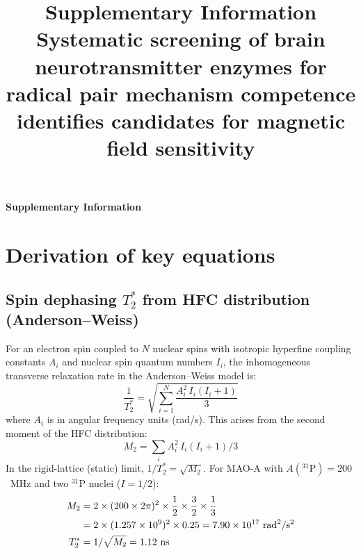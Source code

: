 \documentclass[11pt]{article}
\title{\textbf{Supplementary Information}\\[0.5em]
Systematic screening of brain neurotransmitter enzymes for radical pair mechanism competence identifies candidates for magnetic field sensitivity}
\date{}
\begin{document}
\maketitle
\clearpage
\setcounter{equation}{0}
\setcounter{figure}{0}
\setcounter{table}{0}
\renewcommand{\theequation}{S\arabic{equation}}
\renewcommand{\thefigure}{S\arabic{figure}}
\renewcommand{\thetable}{S\arabic{table}}

\begin{center}
{\LARGE\bfseries Supplementary Information}
\end{center}
\vspace{1em}



\newpage

\section{Derivation of key equations}

\subsection{Spin dephasing $T_2^*$ from HFC distribution (Anderson--Weiss)}

For an electron spin coupled to $N$ nuclear spins with isotropic hyperfine coupling constants $A_i$ and nuclear spin quantum numbers $I_i$, the inhomogeneous transverse relaxation rate in the Anderson--Weiss model is\cite{Anderson1954}:
\begin{equation}
\frac{1}{T_2^*} = \sqrt{\sum_{i=1}^{N} \frac{A_i^2\, I_i(I_i+1)}{3}}
\label{eq:T2star}
\end{equation}
where $A_i$ is in angular frequency units (rad/s). This arises from the second moment of the HFC distribution:
\begin{equation}
M_2 = \sum_i A_i^2\, I_i(I_i+1)/3
\end{equation}
In the rigid-lattice (static) limit, $1/T_2^* = \sqrt{M_2}$. For MAO-A with $A(^{31}\mathrm{P}) = 200$~MHz and two $^{31}$P nuclei ($I = 1/2$):
\begin{align}
M_2 &= 2 \times (200 \times 2\pi)^2 \times \frac{1}{2}\times\frac{3}{2}\times\frac{1}{3} \notag\\
    &= 2 \times (1.257 \times 10^9)^2 \times 0.25 = 7.90 \times 10^{17}~\mathrm{rad}^2/\mathrm{s}^2 \notag\\
T_2^* &= 1/\sqrt{M_2} = 1.12~\mathrm{ns}
\end{align}
\end{document}
